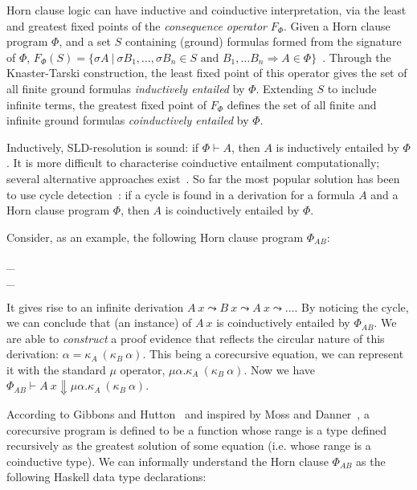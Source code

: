 \documentclass{llncs}
\newcommand{\Conid}[1]{\mathit{#1}}
\newcommand{\Varid}[1]{\mathit{#1}}
\def\resethooks{\global\let\SaveRestoreHook\empty
  \global\let\ColumnHook\empty}
\let\hspost\empty
\begin{document}
Horn clause logic can have inductive and coinductive interpretation, via the least and greatest fixed points of the \emph{consequence operator} $F_{\Phi}$. Given a Horn clause program $\Phi$, and a set $S$ containing (ground) formulas formed from the signature of $\Phi$,
$F_{\Phi}(S) = \{\sigma A\ | \ \sigma B_1, \ldots , \sigma B_n \in S \textrm{ and } B_1, \ldots B_n \Rightarrow A \in \Phi  \}$~\cite{Llo87}. 
Through the Knaster-Tarski construction, the least fixed point of this operator gives the set of all finite ground formulas \emph{inductively entailed} by $\Phi$.
Extending $S$ to include infinite terms,
 the greatest fixed point of $F_{\Phi}$ defines the set of all finite and infinite ground formulas \emph{coinductively entailed} by $\Phi$.

Inductively, SLD-resolution is sound: if $\Phi \vdash A$, then $A$ is inductively entailed by $\Phi$.
It is more difficult to characterise coinductive entailment computationally;
several alternative approaches exist~\cite{SimonBMG07,Llo87,KJ15}.
So far the most
popular solution has been to use cycle detection~\cite{SimonBMG07}: if a cycle
is found in a derivation for a formula $A$ and a Horn clause program $\Phi$,
then $A$ is coinductively entailed by $\Phi$.


Consider, as an example, the following Horn clause program $\Phi_{AB}$:
\begin{hscode}\SaveRestoreHook
\column{B}{@{}>{\hspre}l<{\hspost}@{}}\column{3}{@{}>{\hspre}l<{\hspost}@{}}\column{E}{@{}>{\hspre}l<{\hspost}@{}}\>[3]{}\kappa_\Conid{A}\mathbin{:}\Conid{B}\;\Varid{x}\Rightarrow \Conid{A}\;\Varid{x}{}\<[E]\\
\>[3]{}\kappa_\Conid{B}\mathbin{:}\Conid{A}\;\Varid{x}\Rightarrow \Conid{B}\;\Varid{x}{}\<[E]\ColumnHook
\end{hscode}\resethooks
It gives rise to an infinite derivation $ A\ x \leadsto B\ x  \leadsto A\ x \leadsto \ldots $. 
By noticing the cycle, we can conclude that (an instance) of $A\ x$ is coinductively entailed by $\Phi_{AB}$.
We are able to \emph{construct} a  proof evidence that reflects the circular nature of this derivation:  $\alpha = \kappa_A\ (\kappa_B \ \alpha)$.
This being a corecursive equation, we can represent it with the standard $\mu$ operator, $\mu \alpha.  \kappa_A\ (\kappa_B \ \alpha)$. Now we have
$\Phi_{AB} \vdash A\ x  \Downarrow \mu \alpha.  \kappa_A\ (\kappa_B \ \alpha)$.


According to Gibbons and Hutton~\cite{GH05} and inspired by Moss and Danner~\cite{MD97}, a corecursive program is defined to be a function whose range is a type defined recursively as the greatest solution of some equation (i.e. whose range is a coinductive type).
We can informally understand the Horn clause $\Phi_{AB}$ as the following Haskell data type declarations: 
\end{document}
